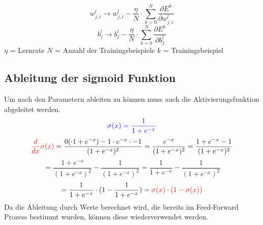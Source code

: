 \documentclass{article}
\begin{document}
\[ w_{j,i}^l \rightarrow w_{j,i}^l - \frac{\eta}{N} \cdot \sum_{k = 0}^{N} \frac{\partial E^k}{\partial w_{j,i}^l} \]
\[ b_j^l \rightarrow b_j^l - \frac{\eta}{N} \cdot \sum_{k = 0}^{N} \frac{\partial E^k}{\partial b_j^l} \]
$\eta$ = Lernrate \kern 20pt $N$ = Anzahl der Trainingsbeispiele \kern 20pt $k$ = Trainingsbeispiel 


\subsection{Ableitung der sigmoid Funktion}
Um nach den Parametern ableiten zu können muss auch die Aktivierungsfunktion abgeleitet werden.
\[ \textcolor{blue}{ \sigma(x) = \frac{1}{1 + e^{-x}} } \]
\[ \textcolor{red}{ \frac{d}{dx}\sigma(x) } = \frac{
0( \cdot 1 + e^{-x}) - 1 \cdot e^{-x} \cdot -1
}{
    (1 + e^{-x})^2
} = \frac{e^{-x}}{(1 + e^{-x})^2} 
= \frac{1 + e^{-x} - 1}{(1 + e^{-x})^2} \]
\[ =\frac{1 + e^{-x}}{(1 + e^{-x})^2} - \frac{1}{(1 + e^{-x})^2} 
= \frac{1}{1 + e^{-x}} - \frac{1}{(1 + e^{-x})^2} \]
\[ = \frac{1}{1 + e^{-x}} \cdot (1 - \frac{1}{1 + e^{-x}}) 
= \textcolor{red}{ \sigma(x) \cdot (1 - \sigma(x)) } \]
Da die Ableitung durch Werte berechnet wird, die bereits im Feed-Forward Prozess bestimmt wurden, können diese wiederverwendet werden.


\pagebreak
\end{document}
